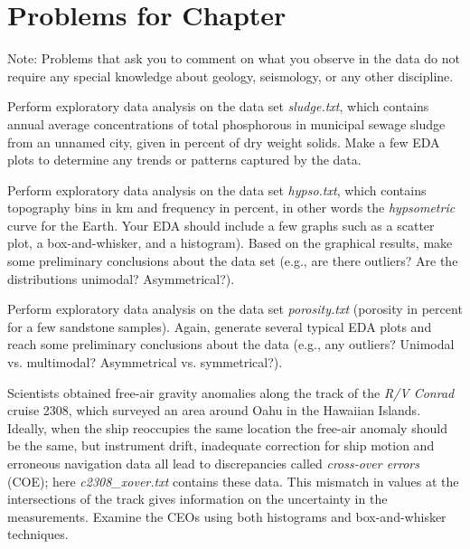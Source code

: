 \clearpage
\section{Problems for Chapter \thechapter}
Note: Problems that ask you to comment on what you observe in the data do not require any special knowledge
about geology, seismology, or any other discipline.

\begin{problem}
Perform exploratory data analysis on the data set \emph{sludge.txt}, which contains annual average concentrations
of total phosphorous in municipal sewage sludge from an unnamed city, given in percent of dry weight solids.
Make a few EDA plots to determine any trends or patterns captured by the data.
\end{problem}

\begin{problem}
Perform exploratory data analysis on the data set \emph{hypso.txt}, which contains topography bins in km and frequency in percent,
in other words the \emph{hypsometric} curve for the Earth.  Your EDA should include a few graphs such as a scatter plot, a box-and-whisker,
and a histogram).  Based on the graphical results, make some
preliminary conclusions about the data set (e.g., are there outliers? Are the distributions unimodal? Asymmetrical?).
\end{problem}

\begin{problem}
Perform exploratory data analysis on the data set \emph{porosity.txt} (porosity in percent for a few
sandstone samples).  Again, generate several typical EDA plots and reach some
preliminary conclusions about the data (e.g., any outliers? Unimodal vs. multimodal? Asymmetrical vs. symmetrical?).
\end{problem}

\begin{problem}
Scientists obtained free-air gravity anomalies along the track of the \emph{R/V Conrad} cruise 2308, which surveyed an area
around Oahu in the Hawaiian Islands.  Ideally, when the ship reoccupies the same location the free-air anomaly should be
the same, but instrument drift, inadequate correction for ship motion and erroneous navigation data all lead to discrepancies
called \emph{cross-over errors} (COE); here \emph{c2308\_xover.txt} contains these data.
This mismatch in values at the intersections of the track gives information on the uncertainty in the measurements.
Examine the CEOs using both histograms and box-and-whisker techniques.
\end{problem}

